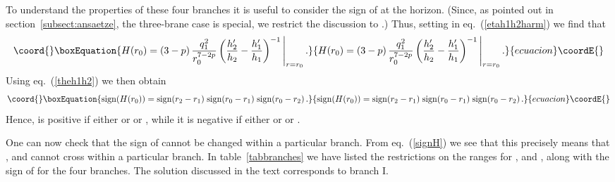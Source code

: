 \documentclass[a4paper,11pt]{article}
\providecommand{\eqref}[1]{(\ref{#1})}
\begin{document}
To understand the properties of these four branches it is useful to
consider the sign of \coordHE{} at the horizon. (Since, as pointed out in
section~\ref{subsect:ansaetze}, the three-brane case is special, we
restrict the discussion to \coordHE{}.) Thus, setting \coordHE{} in
eq.~\eqref{etah1h2harm} we find that
%
\begin{equation}\coord{}\boxEquation{
H(r_0) = (3-p)\,\frac{q_1^2}{r_0^{7-2p}} \left( \frac{h_2'}{h_2} -
\frac{h_1'}{h_1} \right)^{-1} \Bigg\vert_{r=r_0} \,.
}{
H(r_0) = (3-p)\,\frac{q_1^2}{r_0^{7-2p}} \left( \frac{h_2'}{h_2} -
\frac{h_1'}{h_1} \right)^{-1} \Bigg\vert_{r=r_0} \,.
}{ecuacion}\coordE{}\end{equation}
%
Using eq.~\eqref{theh1h2} we then obtain
%
\begin{equation}\coord{}\boxEquation{
\label{signH} \mathrm{sign} (H(r_0)) = \mathrm{sign}(r_2-r_1) \;
\mathrm{sign}(r_0-r_1) \; \mathrm{sign}(r_0-r_2) \,.
}{
\mathrm{sign} (H(r_0)) = \mathrm{sign}(r_2-r_1) \;
\mathrm{sign}(r_0-r_1) \; \mathrm{sign}(r_0-r_2) \,.
}{ecuacion}\coordE{}\end{equation}
%
Hence, \coordHE{} is positive if either \coordHE{} or \coordHE{} or \coordHE{}, while it is negative if either \coordHE{} or \coordHE{} or \coordHE{}.

One can now check that the sign of \coordHE{} cannot be changed within a
particular branch. From eq.~\eqref{signH} we see that this precisely
means that \coordHE{}, \coordHE{} and \coordHE{} cannot cross within a particular
branch. In table~\ref{tabbranches} we have listed the restrictions on
the ranges for \coordHE{}, \coordHE{} and \coordHE{}, along with the sign of \coordHE{}
for the four branches. The solution discussed in the text corresponds
to branch I.
\end{document}
